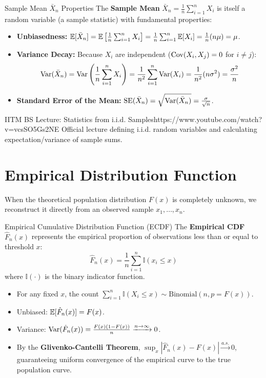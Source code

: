 \begin{formulabox}{Sample Mean $\bar{X}_n$ Properties}
The \textbf{Sample Mean} $\bar{X}_n = \frac{1}{n} \sum_{i=1}^n X_i$ is itself a random variable (a sample statistic) with fundamental properties:
\begin{itemize}
    \item \textbf{Unbiasedness:} $\mathbb{E}[\bar{X}_n] = \mathbb{E}\left[ \frac{1}{n} \sum_{i=1}^n X_i \right] = \frac{1}{n} \sum_{i=1}^n \mathbb{E}[X_i] = \frac{1}{n} (n\mu) = \mu$.
    \item \textbf{Variance Decay:} Because $X_i$ are independent ($\operatorname{Cov}(X_i, X_j) = 0$ for $i \neq j$):
    $$\operatorname{Var}(\bar{X}_n) = \operatorname{Var}\left( \frac{1}{n} \sum_{i=1}^n X_i \right) = \frac{1}{n^2} \sum_{i=1}^n \operatorname{Var}(X_i) = \frac{1}{n^2} (n \sigma^2) = \frac{\sigma^2}{n}$$
    \item \textbf{Standard Error of the Mean:} $\text{SE}(\bar{X}_n) = \sqrt{\operatorname{Var}(\bar{X}_n)} = \frac{\sigma}{\sqrt{n}}$.
\end{itemize}
\end{formulabox}

\begin{videocard}{IITM BS Lecture: Statistics from i.i.d. Samples}{https://www.youtube.com/watch?v=vcsSO5Gs2NE}
Official lecture defining i.i.d. random variables and calculating expectation/variance of sample sums.
\end{videocard}

\section{Empirical Distribution Function}

When the theoretical population distribution $F(x)$ is completely unknown, we reconstruct it directly from an observed sample $x_1, \dots, x_n$.

\begin{definitionbox}{Empirical Cumulative Distribution Function (ECDF)}
The \textbf{Empirical CDF} $\hat{F}_n(x)$ represents the empirical proportion of observations less than or equal to threshold $x$:
$$\hat{F}_n(x) = \frac{1}{n} \sum_{i=1}^n \mathbb{I}(x_i \le x)$$
where $\mathbb{I}(\cdot)$ is the binary indicator function.
\begin{itemize}
    \item For any fixed $x$, the count $\sum_{i=1}^n \mathbb{I}(X_i \le x) \sim \text{Binomial}(n, p = F(x))$.
    \item Unbiased: $\mathbb{E}[\hat{F}_n(x)] = F(x)$.
    \item Variance: $\operatorname{Var}(\hat{F}_n(x)) = \frac{F(x)(1 - F(x))}{n} \xrightarrow{n \to \infty} 0$.
    \item By the \textbf{Glivenko-Cantelli Theorem}, $\sup_{x} |\hat{F}_n(x) - F(x)| \xrightarrow{a.s.} 0$, guaranteeing uniform convergence of the empirical curve to the true population curve.
\end{itemize}
\end{definitionbox}

